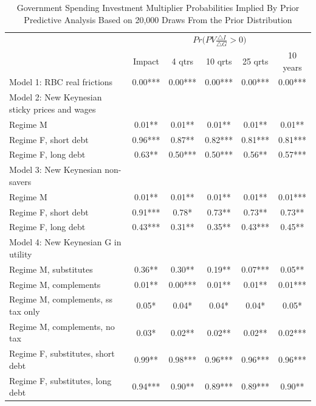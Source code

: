 \documentclass[letterpaper,12pt]{article}%
\begin{document}
\begin{table}[H]
    \centering
    \begin{threeparttable}
    \caption{Government Spending Investment Multiplier Probabilities Implied By Prior Predictive Analysis Based on 20,000 Draws From the Prior Distribution}
    \begin{tabular}{l c c c c c}
    \toprule
        & \multicolumn{5}{c}{$Pr\Big(PV \frac{\triangle I}{\triangle G}>0\Big)$}\\
        \cmidrule{2-6}
        & Impact & 4 qtrs & 10 qrts & 25 qrts & 10 years \\
        \midrule
     Model 1: RBC real frictions &  0.00***   & 0.00***  & 0.00***  & 0.00***  & 0.00***  \\
     Model 2: New Keynesian sticky prices and wages   &    &   &   &   &   \\
     \quad Regime M &  0.01** &  0.01** & 0.01**  & 0.01** &  0.01** \\
     \quad Regime F, short debt &   0.96*** &  0.87** & 0.82*** & 0.81*** & 0.81*** \\
     \quad Regime F, long debt &  0.63** & 0.50*** & 0.50*** & 0.56** & 0.57***  \\
     Model 3: New Keynesian non-savers &    &   &   &   &  \\
     \quad Regime M &  0.01** &  0.01** & 0.01** & 0.01**  & 0.01*** \\
     \quad Regime F, short debt &  0.91*** & 0.78* & 0.73** & 0.73** & 0.73**  \\
     \quad Regime F, long debt &   0.43***  &  0.31** & 0.35** & 0.43***  & 0.45** \\
     Model 4: New Keynesian G in utility &    &   &   &   &  \\
     \quad Regime M, substitutes &   0.36** & 0.30** & 0.19** & 0.07*** & 0.05**  \\
     \quad Regime M, complements &   0.01**  & 0.00***  & 0.01**  & 0.01**  & 0.01***  \\
     \quad Regime M, complements, ss tax only &  0.05* &  0.04*  & 0.04* & 0.04*  & 0.05*  \\
     \quad Regime M, complements, no tax &   0.03* & 0.02** &  0.02**  & 0.02**  & 0.02*** \\
     \quad Regime F, substitutes, short debt &   0.99** &  0.98*** & 0.96***  & 0.96***  & 0.96*** \\
     \quad Regime F, substitutes, long debt &   0.94*** &  0.90** &  0.89*** & 0.89*** & 0.90** \\

\end{tabular}
\end{threeparttable}
\end{table}
\end{document}
